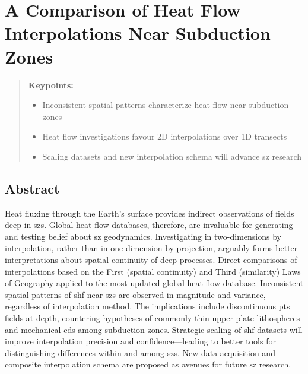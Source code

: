 \hypertarget{a-comparison-of-heat-flow-interpolations-near-subduction-zones}{%
\chapter{A Comparison of Heat Flow Interpolations Near Subduction Zones}\label{a-comparison-of-heat-flow-interpolations-near-subduction-zones}}


\begin{quote}
\textbf{Keypoints:}

\begin{itemize}
\item
  Inconsistent spatial patterns characterize heat flow near subduction zones
\item
  Heat flow investigations favour 2D interpolations over 1D transects
\item
  Scaling datasets and new interpolation schema will advance \gls{sz} research
\end{itemize}
\end{quote}

\hypertarget{abstract-1}{%
\section{Abstract}\label{abstract-1}}

Heat fluxing through the Earth's surface provides indirect observations of  fields deep in \glspl{sz}. Global heat flow databases, therefore, are invaluable for generating and testing belief about \gls{sz} geodynamics. Investigating  in two-dimensions by interpolation, rather than in one-dimension by projection, arguably forms better interpretations about spatial continuity of deep processes. Direct comparisons of interpolations based on the First (spatial continuity) and Third (similarity) Laws of Geography applied to the most updated global heat flow database. Inconsistent spatial patterns of \gls{shf} near \glspl{sz} are observed in magnitude and variance, regardless of interpolation method. The implications include discontinuous \gls{pts} fields at depth, countering hypotheses of commonly thin upper plate lithospheres and mechanical \glspl{cd} among subduction zones. Strategic scaling of \gls{shf} datasets will improve interpolation precision and confidence---leading to better tools for distinguishing differences within and among \glspl{sz}. New data acquisition and composite interpolation schema are proposed as avenues for future \gls{sz} research.

\cleardoublepage

\hypertarget{refs}{}
\begin{CSLReferences}{0}{0}
\end{CSLReferences}


\renewcommand\bibname{REFERENCES}
\cleardoublepage
{}



